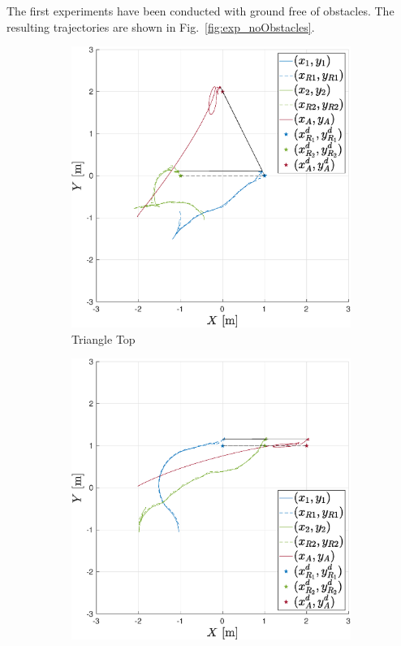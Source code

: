 \documentclass{ifacconf}
\begin{document}
The first experiments have been conducted with ground free of obstacles.
The resulting trajectories are shown in Fig.~\ref{fig:exp_noObstacles}.
\begin{figure}
    \centering
    \begin{subfigure}[b]{0.31\columnwidth}
        \centering
        \includegraphics[width=\linewidth]{images/experiment/nominal/1st_scenario_exp_bigger.eps}
        \caption{Triangle Top}
        \label{fig:exp_noObstacles_1}
    \end{subfigure}
    \begin{subfigure}[b]{0.31\columnwidth}
        \centering
        \includegraphics[width=\linewidth]{images/experiment/nominal/2nd_scenario_exp_bigger.eps}

\end{subfigure}
\end{figure}
\end{document}
